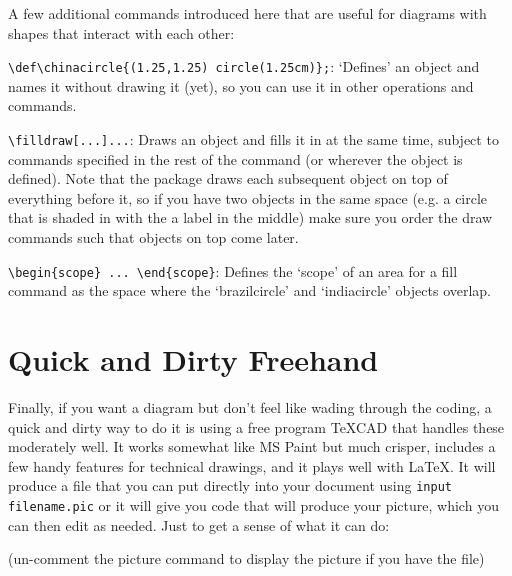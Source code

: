 \documentclass{article}
\begin{document}
A few additional commands introduced here that are useful for diagrams with shapes that interact with each other: \\

\begin{compactitem}
\item \verb+\def\chinacircle{(1.25,1.25) circle(1.25cm)};+: `Defines' an object and names it without drawing it (yet), so you can use it in other operations and commands.
\item \verb+\filldraw[...]...+: Draws an object and fills it in at the same time, subject to commands specified in the rest of the command (or wherever the object is defined).  Note that the package draws each subsequent object on top of everything before it, so if you have two objects in the same space (e.g. a circle that is shaded in with the a label in the middle) make sure you order the draw commands such that objects on top come later.
\item \verb+\begin{scope} ... \end{scope}+: Defines the `scope' of an area for a fill command as the space where the `brazilcircle' and `indiacircle' objects overlap.\\
\end{compactitem}

\clearpage

\section{Quick and Dirty Freehand}

Finally, if you want a diagram but don't feel like wading through the coding, a quick and dirty way to do it is using a free program TeXCAD that handles these moderately well.  It works somewhat like MS Paint but much crisper, includes a few handy features for technical drawings, and it plays well with \LaTeX.  It will produce a file that you can put directly into your document using \verb+input filename.pic+ or it will give you code that will produce your picture, which you can then edit as needed.  Just to get a sense of what it can do:

\begin{center}
%
\begin{scriptsize}
(un-comment the picture command to display the picture if you have the file)
\end{scriptsize}
\end{center}
\end{document}
